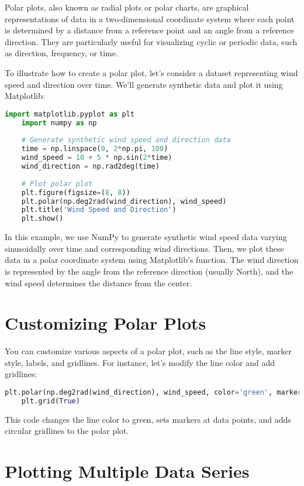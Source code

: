 Polar plots, also known as radial plots or polar charts, are graphical representations of data in a two-dimensional coordinate system where each point is determined by a distance from a reference point and an angle from a reference direction. They are particularly useful for visualizing cyclic or periodic data, such as direction, frequency, or time. \cite{Tosi:2009}

To illustrate how to create a polar plot, let's consider a dataset representing wind speed and direction over time. We'll generate synthetic data and plot it using Matplotlib:

\begin{lstlisting}[language=Python]
	import matplotlib.pyplot as plt
	import numpy as np
	
	# Generate synthetic wind speed and direction data
	time = np.linspace(0, 2*np.pi, 100)
	wind_speed = 10 + 5 * np.sin(2*time)
	wind_direction = np.rad2deg(time)
	
	# Plot polar plot
	plt.figure(figsize=(8, 8))
	plt.polar(np.deg2rad(wind_direction), wind_speed)
	plt.title('Wind Speed and Direction')
	plt.show()
\end{lstlisting}

In this example, we use NumPy to generate synthetic wind speed data varying sinusoidally over time and corresponding wind directions. Then, we plot these data in a polar coordinate system using Matplotlib's  function. The wind direction is represented by the angle from the reference direction (usually North), and the wind speed determines the distance from the center.

\section*{Customizing Polar Plots}

You can customize various aspects of a polar plot, such as the line style, marker style, labels, and gridlines. For instance, let's modify the line color and add gridlines:

\begin{lstlisting}[language=Python]
	plt.polar(np.deg2rad(wind_direction), wind_speed, color='green', marker='o', linestyle='--')
	plt.grid(True)
\end{lstlisting}

This code changes the line color to green, sets markers at data points, and adds circular gridlines to the polar plot.

\section*{Plotting Multiple Data Series}

